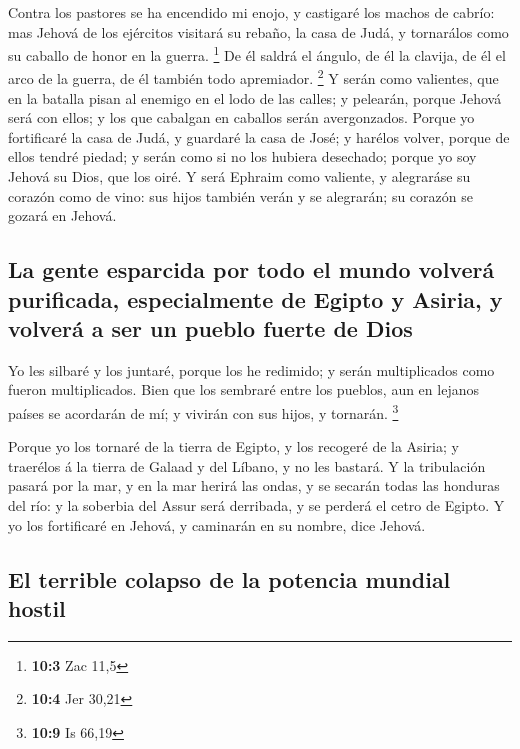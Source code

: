  Contra los pastores se ha encendido mi enojo, y castigaré
los machos de cabrío: mas Jehová de los ejércitos visitará su rebaño, la
casa de Judá, y tornarálos como su caballo de honor en la guerra.
\footnote{\textbf{10:3} Zac 11,5}  De él saldrá el ángulo,
de él la clavija, de él el arco de la guerra, de él también todo
apremiador. \footnote{\textbf{10:4} Jer 30,21}  Y serán como
valientes, que en la batalla pisan al enemigo en el lodo de las calles;
y pelearán, porque Jehová será con ellos; y los que cabalgan en caballos
serán avergonzados.  Porque yo fortificaré la casa de Judá,
y guardaré la casa de José; y harélos volver, porque de ellos tendré
piedad; y serán como si no los hubiera desechado; porque yo soy Jehová
su Dios, que los oiré.  Y será Ephraim como valiente, y
alegraráse su corazón como de vino: sus hijos también verán y se
alegrarán; su corazón se gozará en Jehová.

\hypertarget{la-gente-esparcida-por-todo-el-mundo-volveruxe1-purificada-especialmente-de-egipto-y-asiria-y-volveruxe1-a-ser-un-pueblo-fuerte-de-dios}{%
\subsection{La gente esparcida por todo el mundo volverá purificada,
especialmente de Egipto y Asiria, y volverá a ser un pueblo fuerte de
Dios}\label{la-gente-esparcida-por-todo-el-mundo-volveruxe1-purificada-especialmente-de-egipto-y-asiria-y-volveruxe1-a-ser-un-pueblo-fuerte-de-dios}}

 Yo les silbaré y los juntaré, porque los he redimido; y
serán multiplicados como fueron multiplicados.  Bien que los
sembraré entre los pueblos, aun en lejanos países se acordarán de mí; y
vivirán con sus hijos, y tornarán. \footnote{\textbf{10:9} Is 66,19}

 Porque yo los tornaré de la tierra de Egipto, y los
recogeré de la Asiria; y traerélos á la tierra de Galaad y del Líbano, y
no les bastará.  Y la tribulación pasará por la mar, y en
la mar herirá las ondas, y se secarán todas las honduras del río: y la
soberbia del Assur será derribada, y se perderá el cetro de Egipto.
 Y yo los fortificaré en Jehová, y caminarán en su nombre,
dice Jehová.

\hypertarget{el-terrible-colapso-de-la-potencia-mundial-hostil}{%
\subsection{El terrible colapso de la potencia mundial
hostil}\label{el-terrible-colapso-de-la-potencia-mundial-hostil}}

